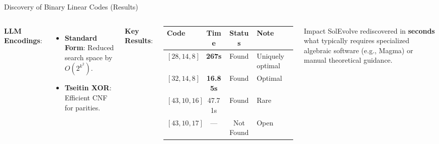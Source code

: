 \documentclass[10pt, aspectratio=169]{beamer}
\begin{document}
\begin{frame}{Discovery of Binary Linear Codes (Results)}
    \begin{columns}
        \textbf{LLM Encodings}:
        \begin{itemize} \footnotesize
            \item \textbf{Standard Form}: Reduced search space by $O(2^{k^2})$.
            \item \textbf{Tseitin XOR}: Efficient CNF for parities.
        \end{itemize}

        \vspace{0.3cm}
        \textbf{Key Results}:
        \begin{table}
        \centering \small
        \begin{tabular}{lccl}
        \toprule
        \textbf{Code} & \textbf{Time} & \textbf{Status} & \textbf{Note} \\ \midrule
        $[28,14,8]$ & \textbf{267s} & Found & Uniquely optimal \\
        $[32,14,8]$ & \textbf{16.85s} & Found & Optimal \\
        $[43,10,16]$ & 47.71s & Found & Rare \\
        $[43,10,17]$ & --- & Not Found & Open \\
        \bottomrule
        \end{tabular}
        \end{table}

        \begin{alertblock}{Impact}
            SolEvolve rediscovered in \textbf{seconds} what typically requires specialized algebraic software (e.g., Magma) or manual theoretical guidance.
        \end{alertblock}
    \end{columns}
\end{frame}
\end{document}
